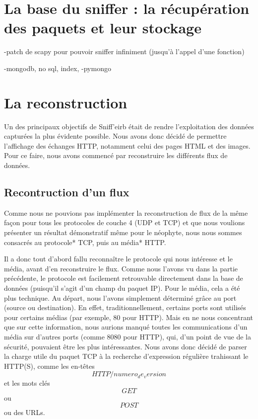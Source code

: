 \section{La base du sniffer : la récupération des paquets et leur stockage}


-patch de scapy pour pouvoir sniffer infiniment (jusqu'à l'appel d'une fonction)

-mongodb, no sql, index, 
-pymongo


\section{La reconstruction}

Un des principaux objectifs de Sniff'eirb était de rendre l'exploitation des données capturées la plus évidente possible.
Nous avons donc décidé de permettre l'affichage des échanges HTTP, notamment celui des pages HTML et des images. Pour ce
faire, nous avons commencé par reconstruire les différents flux de données.

\subsection{Recontruction d'un flux}

Comme nous ne pouvions pas implémenter la reconstruction de flux de la même façon pour tous les protocoles de couche 4 (UDP et TCP) et
que nous voulions présenter un résultat démonstratif même pour le néophyte, nous nous sommes consacrés au protocole* TCP, puis au média* HTTP.


\indent Il a donc tout d'abord fallu reconnaître le protocole qui nous intéresse et le média, avant d'en reconstruire le flux. Comme nous l'avons vu 
dans la partie précédente, le protocole est facilement retrouvable directement dans la base de données (puisqu'il s'agit d'un champ du paquet IP). 
Pour le média, cela a été plus technique. Au départ, nous l'avons simplement déterminé grâce au port (source ou destination). En effet, traditionnellement,
certains ports sont utilisés pour certains médias (par exemple, 80 pour HTTP). Mais en ne nous concentrant que sur cette information, nous aurions manqué
toutes les communications d'un média sur d'autres ports (comme 8080 pour HTTP), qui, d'un point de vue de la sécurité, pouvaient être les plus intéressantes.
Nous avons donc décidé de parser la charge utile du paquet TCP à la recherche d'expression régulière trahissant le HTTP(S), comme les en-têtes
 $$HTTP/numero_de_version$$ et les mots clés $$GET$$ ou $$POST$$ ou des URLs.



